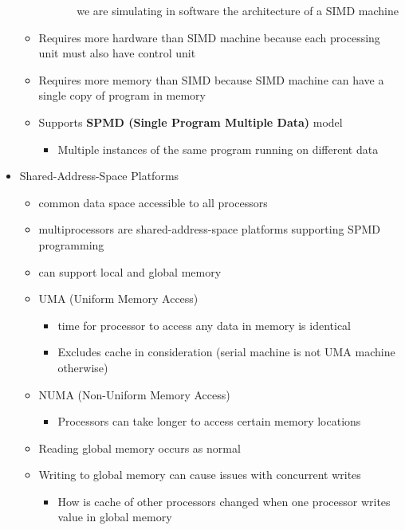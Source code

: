\documentclass[a4paper]{article}
\begin{document}
\begin{itemize}
\begin{itemize}
\begin{itemize}
\begin{itemize}
                  we are simulating in software the architecture of a SIMD machine
            \end{itemize}
        \end{itemize}
      \item Requires more hardware than SIMD machine because each processing unit must also have control unit
      \item Requires more memory than SIMD because SIMD machine can have a single copy of program in memory
      \item Supports \textbf{SPMD (Single Program Multiple Data)} model
        \begin{itemize}
          \item Multiple instances of the same program running on different data
        \end{itemize}
    \end{itemize}
  \item Shared-Address-Space Platforms
    \begin{itemize}
      \item common data space accessible to all processors
      \item multiprocessors are shared-address-space platforms supporting SPMD programming
      \item can support local and global memory
      \item UMA (Uniform Memory Access)
        \begin{itemize}
          \item time for processor to access any data in memory is identical
          \item Excludes cache in consideration (serial machine is not UMA machine otherwise)
        \end{itemize}
      \item NUMA (Non-Uniform Memory Access)
        \begin{itemize}
          \item Processors can take longer to access certain memory locations
        \end{itemize}
      \item Reading global memory occurs as normal
      \item Writing to global memory can cause issues with concurrent writes
        \begin{itemize}
          \item \color{red} How is cache of other processors changed when one processor writes value in global memory
        \end{itemize}

\end{itemize}
\end{itemize}
\end{document}
